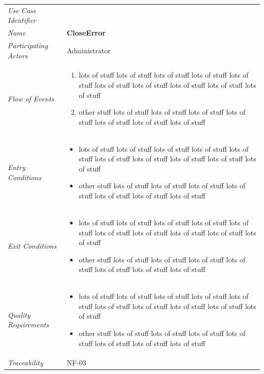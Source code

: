 \documentclass[12pt,letterpaper]{article}
\begin{document}
\begin{center}
	\begin{tabu} to 
		\toprule
		Use Case Identifier & \closeerror{} \\
		Name & {\bf CloseError} \\
		Participating Actors & Administrator \\
		Flow of Events & 
	    \begin{enumerate}[topsep=-1em]
		    \item lots of stuff lots of stuff lots of stuff lots of stuff lots of stuff lots of stuff lots of stuff lots of stuff lots of stuff lots of stuff
		    \item other stuff lots of stuff lots of stuff lots of stuff lots of stuff lots of stuff lots of stuff lots of stuff
		\end{enumerate} \\

		Entry Conditions &
		\begin{itemize}[topsep=-1em]
		    \item lots of stuff lots of stuff lots of stuff lots of stuff lots of stuff lots of stuff lots of stuff lots of stuff lots of stuff lots of stuff
		    \item other stuff lots of stuff lots of stuff lots of stuff lots of stuff lots of stuff lots of stuff lots of stuff
        \end{itemize} \\

		Exit Conditions &
		\begin{itemize}[topsep=-1em]
		    \item lots of stuff lots of stuff lots of stuff lots of stuff lots of stuff lots of stuff lots of stuff lots of stuff lots of stuff lots of stuff
		    \item other stuff lots of stuff lots of stuff lots of stuff lots of stuff lots of stuff lots of stuff lots of stuff
        \end{itemize} \\

		Quality Requirements &
		\begin{itemize}[topsep=-1em]
		    \item lots of stuff lots of stuff lots of stuff lots of stuff lots of stuff lots of stuff lots of stuff lots of stuff lots of stuff lots of stuff
		    \item other stuff lots of stuff lots of stuff lots of stuff lots of stuff lots of stuff lots of stuff lots of stuff
        \end{itemize} \\

		Traceability & NF-03 \\
		\toprule
	\end{tabu}
\end{center}
\end{document}
